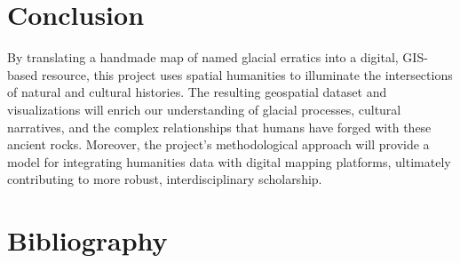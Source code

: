 \documentclass{article}
\begin{document}
\section{Conclusion}
By translating a handmade map of named glacial erratics into a digital, GIS-based resource, this project uses spatial humanities to illuminate the intersections of natural and cultural histories. The resulting geospatial dataset and visualizations will enrich our understanding of glacial processes, cultural narratives, and the complex relationships that humans have forged with these ancient rocks. Moreover, the project's methodological approach will provide a model for integrating humanities data with digital mapping platforms, ultimately contributing to more robust, interdisciplinary scholarship.

\section*{Bibliography}
\printbibliography[heading=none]
\end{document}
